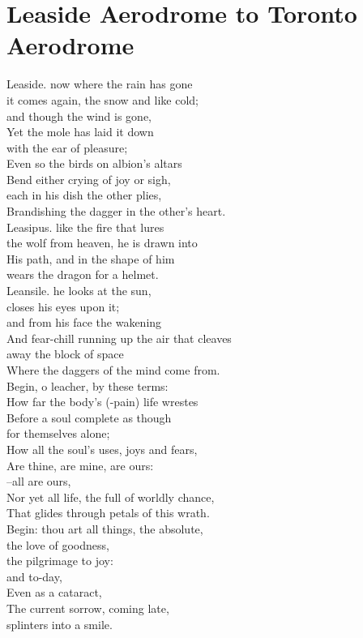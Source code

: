 \documentclass[smalldemyvopaper,11pt,twoside,onecolumn,openright,extrafontsizes]{memoir}
\begin{document}
\chapter{Leaside Aerodrome to Toronto Aerodrome}
Leaside.  now where the rain has gone
\\it comes again, the snow and like cold;
\\and though the wind is gone,
\\Yet the mole has laid it down
\\with the ear of pleasure;
\\Even so the birds on albion's altars
\\Bend either crying of joy or sigh,
\\each in his dish the other plies,
\\Brandishing the dagger in the other's heart.
\\Leasipus.            like the fire that lures
\\the wolf from heaven, he is drawn into
\\His path, and in the shape of him
\\wears the dragon for a helmet.
\\Leansile.              he looks at the sun,
\\closes his eyes upon it;
\\and from his face the wakening
\\And fear-chill running up the air that cleaves
\\away the block of space
\\Where the daggers of the mind come from.
\\Begin, o leacher, by these terms:
\\How far the body's (-pain) life wrestes
\\Before a soul complete as though
\\for themselves alone;
\\How all the soul's uses, joys and fears,
\\Are thine, are mine, are ours:
\\--all are ours,
\\Nor yet all life, the full of worldly chance,
\\That glides through petals of this wrath.
\\Begin: thou art all things, the absolute,
\\the love of goodness,
\\the pilgrimage to joy:
\\and to-day,
\\Even as a cataract,
\\The current sorrow, coming late,
\\splinters into a smile.
\end{document}
